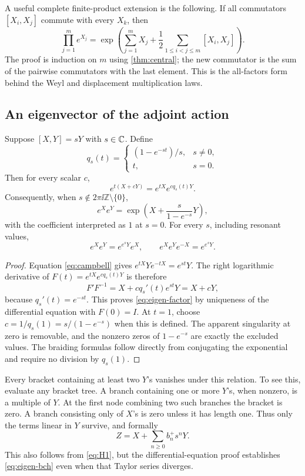 A useful complete finite-product extension is the following. If all commutators $[X_i,X_j]$ commute with every $X_k$, then
\begin{equation}\label{eq:central-many}
 \prod_{j=1}^{m}e^{X_j}
 =\exp\!\left(\sum_{j=1}^{m}X_j+
       \frac12\sum_{1\leq i<j\leq m}[X_i,X_j]\right).
\end{equation}
The proof is induction on $m$ using \cref{thm:central}; the new commutator is the sum of the pairwise commutators with the last element. This is the all-factors form behind the Weyl and displacement multiplication laws.

\subsection{An eigenvector of the adjoint action}
\begin{theorem}[{The relation $[X,Y]=sY$}]\label{thm:eigenline}
Suppose $[X,Y]=sY$ with $s\in\mathbb C$. Define
\[
 q_s(t)=\begin{cases}(1-e^{-st})/s,&s\ne0,\\t,&s=0.\end{cases}
\]
Then for every scalar $c$,
\begin{equation}\label{eq:eigen-factor}
 e^{t(X+cY)}=e^{tX}e^{c q_s(t)Y}.
\end{equation}
Consequently, when $s\notin2\pi\ii\mathbb Z\setminus\{0\}$,
\begin{equation}\label{eq:eigen-bch}
 \boxed{\displaystyle e^Xe^Y=\exp\!\left(X+\frac{s}{1-e^{-s}}Y\right),}
\end{equation}
with the coefficient interpreted as $1$ at $s=0$. For every $s$, including resonant values,
\begin{equation}\label{eq:eigen-braid}
 e^Xe^Y=e^{e^sY}e^X,\qquad e^Xe^Ye^{-X}=e^{e^sY}.
\end{equation}
\end{theorem}
\begin{proof}
Equation \cref{eq:campbell} gives $e^{tX}Ye^{-tX}=e^{st}Y$. The right logarithmic derivative of
$F(t)=e^{tX}e^{c q_s(t)Y}$ is therefore
\[
 F'F^{-1}=X+c q_s'(t)e^{st}Y=X+cY,
\]
because $q_s'(t)=e^{-st}$. This proves \cref{eq:eigen-factor} by uniqueness of the differential equation with $F(0)=I$. At $t=1$, choose $c=1/q_s(1)=s/(1-e^{-s})$ when this is defined. The apparent singularity at zero is removable, and the nonzero zeros of $1-e^{-s}$ are exactly the excluded values. The braiding formulas follow directly from conjugating the exponential and require no division by $q_s(1)$.
\end{proof}
Every bracket containing at least two $Y$'s vanishes under this relation. To see this, evaluate any bracket tree. A branch containing one or more $Y$'s, when nonzero, is a multiple of $Y$. At the first node combining two such branches the bracket is zero. A branch consisting only of $X$'s is zero unless it has length one. Thus only the terms linear in $Y$ survive, and formally
\begin{equation}\label{eq:eigen-series}
 Z=X+\sum_{n\geq0}b_n^+s^nY.
\end{equation}
This also follows from \cref{eq:H1}, but the differential-equation proof establishes \cref{eq:eigen-bch} even when that Taylor series diverges.

